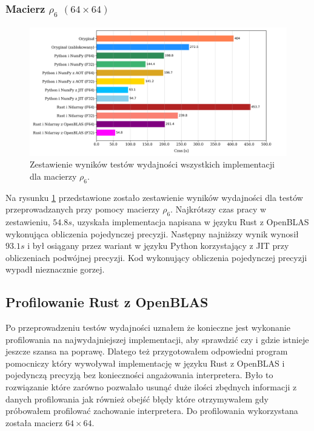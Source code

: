 \documentclass[11pt, a4paper]{article}
\begin{document}
\begin{sloppypar}
    \subsubsection{Macierz \texorpdfstring{$\rho_{6}$ $(64\times64)$}{rho6 64x64}}
    \begin{figure}[ht]
      \centering
      \includegraphics[width=1.0\textwidth]{"resources/rho_6_matrix_comparison.png"}
      \caption{Zestawienie wyników testów wydajności wszystkich implementacji dla macierzy $\rho
      _{6}$.}
      \label{matrix-comparison-rho-6-plot}
    \end{figure}
    Na rysunku \ref{matrix-comparison-rho-6-plot} przedstawione zostało zestawienie
    wyników wydajności dla testów przeprowadzanych przy pomocy macierzy $\rho_{6}$. Najkrótszy
    czas pracy w zestawieniu, $54.8s$, uzyskała implementacja napisana w języku Rust z OpenBLAS
    wykonująca obliczenia pojedynczej precyzji. Następny najniższy wynik wynosił $93.1s$
    i był osiągany przez wariant w języku Python korzystający z JIT przy obliczeniach
    podwójnej precyzji. Kod wykonujący obliczenia pojedynczej precyzji wypadł nieznacznie
    gorzej.

    \FloatBarrier

    \subsection{Profilowanie Rust z OpenBLAS}


    Po przeprowadzeniu testów wydajności uznałem że konieczne jest wykonanie
    profilowania na najwydajniejszej implementacji, aby sprawdzić czy i gdzie istnieje jeszcze
    szansa na poprawę. Dlatego też przygotowałem odpowiedni program pomocniczy który
    wywoływał implementację w języku Rust z OpenBLAS i pojedynczą precyzją bez
    konieczności angażowania interpretera. Było to rozwiązanie które zarówno pozwalało usunąć
    duże ilości zbędnych informacji z danych profilowania jak również obejść błędy które
    otrzymywałem gdy próbowałem profilować zachowanie interpretera. Do profilowania
    wykorzystana została macierz $64\times 64$.


\end{sloppypar}
\end{document}
